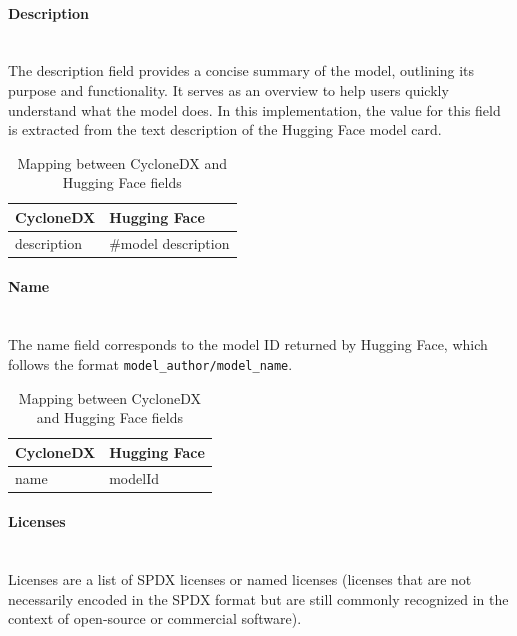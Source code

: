 \documentclass[12pt,a4paper, oneside, openright]{book}
\begin{document}
\paragraph{Description} \mbox{} \\
The description field provides a concise summary of the model, outlining its purpose and functionality. It serves as an overview to help users quickly understand what the model does. In this implementation, the value for this field is extracted from the text description of the Hugging Face model card.
\begin{table}[h!]
    \centering
    \begin{tabular}{|p{7cm}|p{6cm}|}
        \hline
        \textbf{CycloneDX} & \textbf{Hugging Face}\\ \hline
           description    
           & \#model description
        \\ \hline  
    \end{tabular}
\caption{Mapping between CycloneDX and Hugging Face fields}
    \label{tab:cyclonedx_huggingface}
\end{table}

\paragraph{Name} \mbox{} \\
The name field corresponds to the model ID returned by Hugging Face, which follows the format \texttt{model\_author/model\_name}.
\begin{table}[h]
    \centering
    \begin{tabular}{|p{7cm}|p{6cm}|}
        \hline
        \textbf{CycloneDX} & \textbf{Hugging Face}\\ \hline
        name & modelId \\ \hline
    \end{tabular}
    \caption{Mapping between CycloneDX and Hugging Face fields}
    \label{tab:cyclonedx_huggingface}
\end{table}

\newpage
\paragraph{Licenses} \mbox{} \\
Licenses are a list of SPDX licenses or named licenses (licenses that are not necessarily encoded in the SPDX format but are still commonly recognized in the context of open-source or commercial software).
\end{document}
